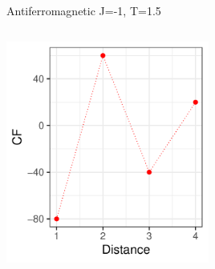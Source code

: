 \documentclass{beamer}
\begin{document}
\begin{frame}{Antiferromagnetic J=-1, T=1.5}
\begin{columns}
\begin{column}{0.5\textwidth}
\begin{center}
     \end{center}
         \begin{center}
     \includegraphics[width=0.5\textwidth]{Pic/J-1_60_2500_T=1.5_CORRELATION.pdf}
     \end{center}
\end{column}
\end{columns}
\end{frame}
\end{document}
